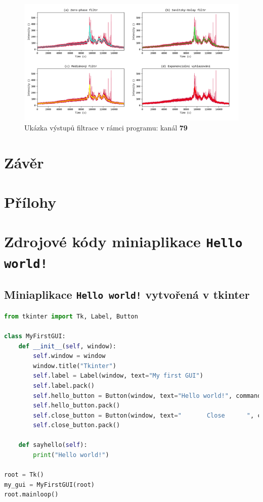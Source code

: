 \documentclass[a4paper, 12pt]{article}
\begin{document}
\vskip 0.5in
\begin{figure}[hbt!]
 \centering
 \includegraphics[width=\linewidth,height=0.65\linewidth]{exp_figures.png}
 \caption{Ukázka výstupů filtrace v rámci programu: kanál \textbf{79}}
 \label{fig:exp_filtry}
\end{figure}


\newpage
\section{Závěr}


\newpage



\newpage
\listoffigures

\newpage
\section*{Přílohy}
\appendix
\section{Zdrojové kódy miniaplikace \texttt{Hello world!}}
\label{PrilohaA}
\subsection{Miniaplikace \texttt{Hello world!} vytvořená v tkinter}
\begin{lstlisting}[language=Python]
from tkinter import Tk, Label, Button

class MyFirstGUI:
    def __init__(self, window):
        self.window = window
        window.title("Tkinter")
        self.label = Label(window, text="My first GUI")
        self.label.pack()
        self.hello_button = Button(window, text="Hello world!", command=self.sayhello)
        self.hello_button.pack()
        self.close_button = Button(window, text="       Close      ", command=window.quit)
        self.close_button.pack()

    def sayhello(self):
        print("Hello world!")

root = Tk()
my_gui = MyFirstGUI(root)
root.mainloop()
\end{lstlisting}
\newpage
\end{document}
